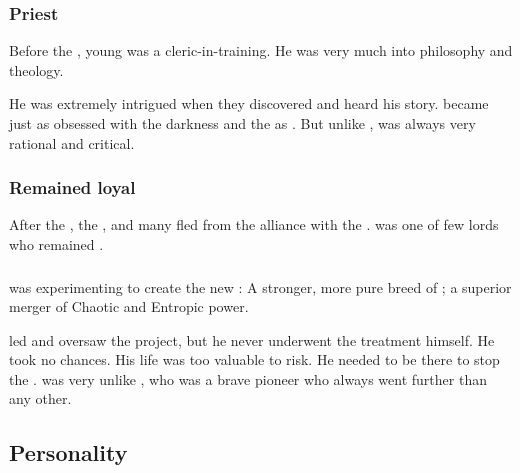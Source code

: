 \subsubsection{Priest}
Before the , young \Gevural{} was a cleric-in-training. 
He was very much into philosophy and theology. 

He was extremely intrigued when they discovered \Semiza{} and heard his story. 
\Gevural{} became just as obsessed with the darkness and the \banes{} as \Zachirah. 
But unlike \Zachirah, \Gevural{} was always very rational and critical. 






\subsubsection{Remained loyal}
After the , the \resphain{} , and many fled from the alliance with the \banelords. 
\Azraid{} was one of few \resphan{} lords who remained . 





\subsubsection{\NeoResphain}
\Azraid{} was experimenting to create the new : 
A stronger, more pure breed of \resphan; a superior merger of Chaotic and Entropic power. 

\Azraid led and oversaw the \neoresphan project, but he never underwent the treatment himself. 
He took no chances. 
His life was too valuable to risk.
He needed to be there to stop the \banes.
\Azraid was very unlike \Sethicus, who was a brave pioneer who always went further than any other. 









\subsection{Personality}





